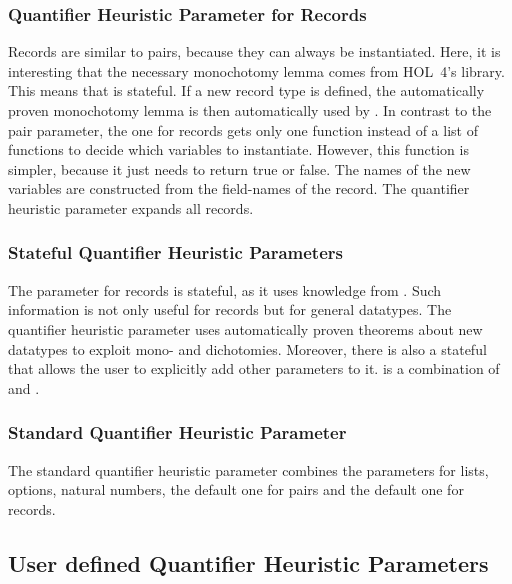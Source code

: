 \subsubsection{Quantifier Heuristic Parameter for Records}

Records are similar to pairs, because they can always be instantiated. Here, it is interesting that the necessary
monochotomy lemma comes from HOL~4's  library. This means that  is stateful.
If a new record type is defined, the automatically proven monochotomy lemma is then automatically used
by . In contrast to the pair parameter, the one for records gets only one function instead of a
list of functions to decide which variables to instantiate. However, this function is simpler, because it just needs
to return true or false. The names of the new variables are constructed from the field-names of the record.
The quantifier heuristic parameter  expands all records.

\subsubsection{Stateful Quantifier Heuristic Parameters}

The parameter for records is stateful, as it uses knowledge from
. Such information is not only useful for records
but for general datatypes. The quantifier heuristic parameter
 uses automatically proven theorems about new
datatypes to exploit mono- and dichotomies. Moreover, there is also a
stateful  that allows the user to
explicitly add other parameters to it.   is a
combination of  and .

\subsubsection{Standard Quantifier Heuristic Parameter}

The standard quantifier heuristic parameter  combines
the parameters for lists, options, natural numbers, the default one
for pairs and the default one for records.


\subsection{User defined Quantifier Heuristic Parameters}\label{sec:qps-user}

